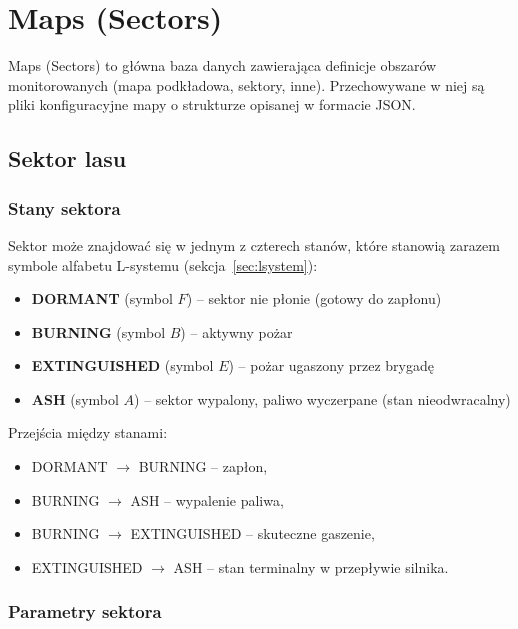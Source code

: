 \documentclass[11pt,a4paper]{article}
\begin{document}
\section*{Maps (Sectors)}
Maps (Sectors) to główna baza danych zawierająca definicje obszarów monitorowanych (mapa podkładowa, sektory, inne). Przechowywane w niej są pliki konfiguracyjne mapy o strukturze opisanej w formacie JSON.  


\subsection{Sektor lasu}

\subsubsection{Stany sektora}




Sektor może znajdować się w jednym z czterech stanów, które stanowią zarazem symbole alfabetu L-systemu (sekcja~\ref{sec:lsystem}):
\begin{itemize}
    \item \textbf{DORMANT} (symbol $F$) -- sektor nie płonie (gotowy do zapłonu)
    \item \textbf{BURNING} (symbol $B$) -- aktywny pożar
    \item \textbf{EXTINGUISHED} (symbol $E$) -- pożar ugaszony przez brygadę
    \item \textbf{ASH} (symbol $A$) -- sektor wypalony, paliwo wyczerpane (stan nieodwracalny)
\end{itemize}

Przejścia między stanami:
\begin{itemize}
    \item DORMANT $\rightarrow$ BURNING -- zapłon,
    \item BURNING $\rightarrow$ ASH -- wypalenie paliwa,
    \item BURNING $\rightarrow$ EXTINGUISHED -- skuteczne gaszenie,
    \item EXTINGUISHED $\rightarrow$ ASH -- stan terminalny w przepływie silnika.
\end{itemize}

\subsubsection{Parametry sektora}
\end{document}
